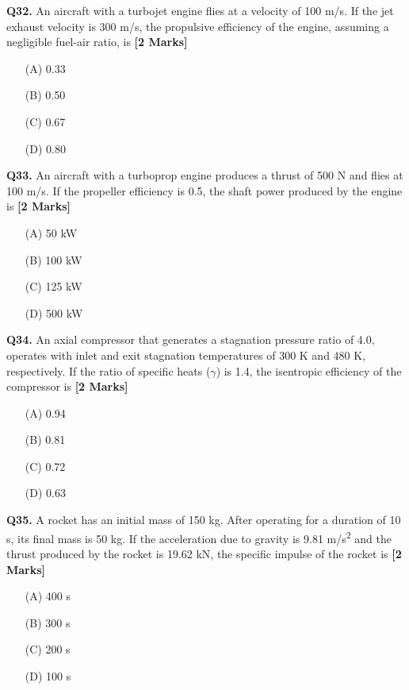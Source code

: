 \documentclass[11pt]{article}
\newcommand{\questionb}[2]{
    \noindent\textbf{Q#2.} #1 \hfill \textbf{[2 Marks]}
}
\begin{document}
\vspace{0.5cm}

\questionb{An aircraft with a turbojet engine flies at a velocity of 100 m/s. If the jet exhaust velocity is 300 m/s, the propulsive efficiency of the engine, assuming a negligible fuel-air ratio, is}{32}
\begin{enumerate}
    \item[(A)] 0.33  
    \item[(B)] 0.50  
    \item[(C)] 0.67  
    \item[(D)] 0.80  
\end{enumerate}

\vspace{0.5cm}

\questionb{An aircraft with a turboprop engine produces a thrust of 500 N and flies at 100 m/s. If the propeller efficiency is 0.5, the shaft power produced by the engine is}{33}
\begin{enumerate}
    \item[(A)] 50 kW  
    \item[(B)] 100 kW  
    \item[(C)] 125 kW  
    \item[(D)] 500 kW  
\end{enumerate}

\vspace{0.5cm}

\questionb{An axial compressor that generates a stagnation pressure ratio of 4.0, operates with inlet and exit stagnation temperatures of 300 K and 480 K, respectively. If the ratio of specific heats ($\gamma$) is 1.4, the isentropic efficiency of the compressor is}{34}
\begin{enumerate}
    \item[(A)] 0.94  
    \item[(B)] 0.81  
    \item[(C)] 0.72  
    \item[(D)] 0.63  
\end{enumerate}

\vspace{0.5cm}

\questionb{A rocket has an initial mass of 150 kg. After operating for a duration of 10 s, its final mass is 50 kg. If the acceleration due to gravity is 9.81 m/s\textsuperscript{2} and the thrust produced by the rocket is 19.62 kN, the specific impulse of the rocket is}{35}
\begin{enumerate}
    \item[(A)] 400 s  
    \item[(B)] 300 s  
    \item[(C)] 200 s  
    \item[(D)] 100 s  
\end{enumerate}
\end{document}
